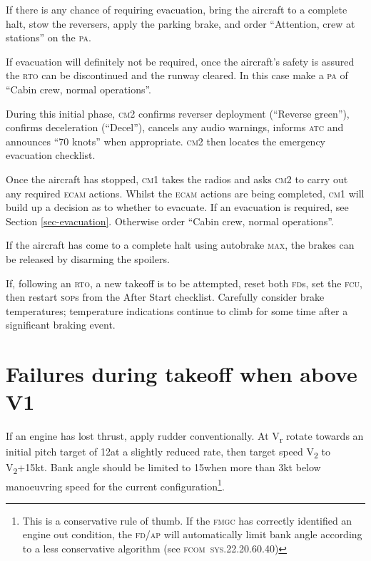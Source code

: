 \documentclass[a5paper,11pt,twoside]{book}
\newcommand{\ac}[1]{{\scshape\MakeLowercase{#1}}}
\newcommand{\cphrase}[1]{\ac{#1}}
\newcommand{\inlcite}[1]{{\ac{#1}}}
\newcommand{\multicite}[1]{%
  \nopagebreak
  \noindent{{\color{blue}\footnotesize[ \inlcite{#1} ]}}
}
\newcommand{\V}[1]{V\textsubscript{#1}}
\begin{document}
If there is any chance of requiring evacuation, bring the aircraft to a complete
halt, stow the reversers, apply the parking brake, and order ``Attention, crew
at stations'' on the \ac{PA}.

If evacuation will definitely not be required, once the aircraft's safety is
assured the \ac{RTO} can be discontinued and the runway cleared. In this case
make a \ac{PA} of ``Cabin crew, normal operations''.

During this initial phase, \ac{CM2} confirms reverser deployment (``Reverse
green''), confirms deceleration (``Decel''), cancels any audio warnings, informs
\ac{ATC} and announces ``70 knots'' when appropriate. \ac{CM2} then locates the
emergency evacuation checklist.

Once the aircraft has stopped, \ac{CM1} takes the radios and asks \ac{CM2} to
carry out any required \ac{ECAM} actions. Whilst the \ac{ECAM} actions are being
completed, \ac{CM1} will build up a decision as to whether to evacuate. If an
evacuation is required, see Section \ref{sec-evacuation}. Otherwise order
``Cabin crew, normal operations''.

If the aircraft has come to a complete halt using autobrake \cphrase{MAX}, the brakes
can be released by disarming the spoilers.

If, following an \ac{RTO}, a new takeoff is to be attempted, reset both
\ac{FD}s, set the \ac{FCU}, then restart \ac{SOP}s from the After Start
checklist. Carefully consider brake temperatures; temperature indications
continue to climb for some time after a significant braking event.

\multicite{EOMB~3.10, FCTM~PRO.AEP.MISC}


\section{Failures during takeoff when above V1}
\label{sec-failures-after-v1}

If an engine has lost thrust, apply rudder conventionally. At V\textsubscript{r}
rotate towards an initial pitch target of 12\textonehalf\textdegree{ }at a
slightly reduced rate, then target speed \V{2} to \V{2}+15kt. Bank angle should
be limited to 15\textdegree{ }when more than 3kt below manoeuvring speed for the
current configuration\footnote{This is a conservative rule of thumb. If the
\ac{FMGC} has correctly identified an engine out condition, the \ac{FD/AP} will
automatically limit bank angle according to a less conservative
algorithm (see \inlcite{FCOM~SYS.22.20.60.40})}.
\end{document}
